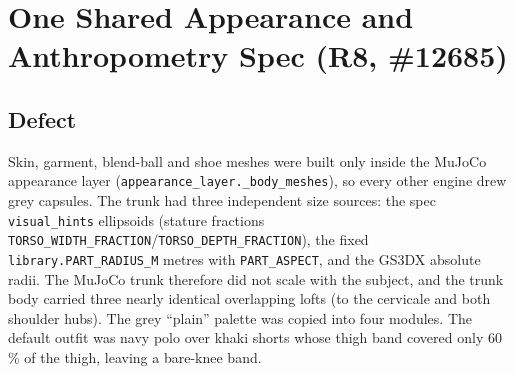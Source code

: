 \section{One Shared Appearance and Anthropometry Spec (R8, \#12685)}

\subsection{Defect}
Skin, garment, blend-ball and shoe meshes were built only inside the MuJoCo
appearance layer (\texttt{appearance\_layer.\_body\_meshes}), so every other
engine drew grey capsules. The trunk had three independent size sources: the
spec \texttt{visual\_hints} ellipsoids (stature fractions
\texttt{TORSO\_WIDTH\_FRACTION}/\texttt{TORSO\_DEPTH\_FRACTION}), the fixed
\texttt{library.PART\_RADIUS\_M} metres with \texttt{PART\_ASPECT}, and the
GS3DX absolute radii. The MuJoCo trunk therefore did not scale with the
subject, and the trunk body carried three nearly identical overlapping lofts
(to the cervicale and both shoulder hubs). The grey ``plain'' palette was
copied into four modules. The default outfit was navy polo over khaki shorts
whose thigh band covered only 60\,\% of the thigh, leaving a bare-knee band.

